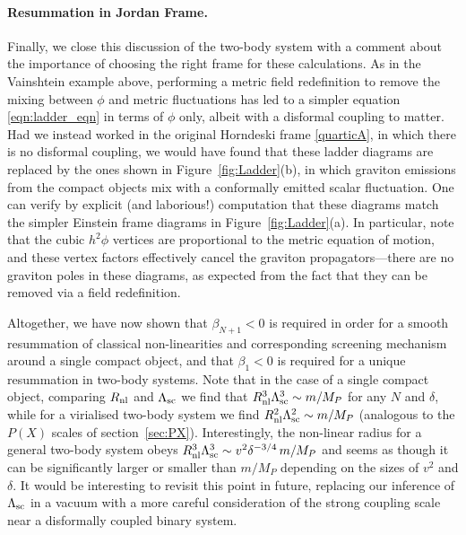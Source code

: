 \documentclass[11pt]{article}
\begin{document}
\paragraph{Resummation in Jordan Frame.}
Finally, we close this discussion of the two-body system with a comment about the importance of choosing the right frame for these calculations. As in the Vainshtein example above, performing a metric field redefinition to remove the mixing between $\phi$ and metric fluctuations has led to a simpler equation \eqref{eqn:ladder_eqn} in terms of $\phi$ only, albeit with a disformal coupling to matter. 
Had we instead worked in the original Horndeski frame \eqref{quarticA}, in which there is no disformal coupling, we would have found that these ladder diagrams are replaced by the ones shown in Figure~\ref{fig:Ladder}(b), in which graviton emissions from the  compact objects mix with a conformally emitted scalar fluctuation.  
One can verify by explicit (and laborious!) computation that these diagrams match the simpler Einstein frame diagrams in Figure~\ref{fig:Ladder}(a). 
In particular, note that the cubic $h^2 \phi$ vertices are proportional to the metric equation of motion, and these vertex factors effectively cancel the graviton propagators---there are no graviton poles in these diagrams, as expected from the fact that they can be removed via a field redefinition.  

\noindent Altogether, we have now shown that $\beta_{N+1} < 0$ is required in order for a smooth resummation of classical non-linearities and corresponding screening mechanism around a single compact object, and that $\beta_1 < 0$ is required for a unique resummation in two-body systems.   
Note that in the case of a single compact object, comparing $R_{\rm nl}$ and $\Lambda_{\rm sc}$ we find that $R_{\rm nl}^3 \Lambda_{\rm sc}^3 \sim m / M_P$ for any $N$ and $\delta$, while for a virialised two-body system we find $R_{\rm nl}^2 \Lambda_{\rm sc}^2 \sim m /M_P$ (analogous to the $P(X)$ scales of section~\ref{sec:PX}). Interestingly, the non-linear radius for a general two-body system obeys $R_{\rm nl}^3 \Lambda_{\rm sc}^3 \sim v^{2} \delta^{-3/4} \, m/M_P$ and seems as though it can be significantly larger or smaller than $m/M_P$ depending on the sizes of $v^2$ and $\delta$. It would be interesting to revisit this point in future, replacing our inference of $\Lambda_{\rm sc}$ in a vacuum with a more careful consideration of the strong coupling scale near a disformally coupled binary system.     
\end{document}
